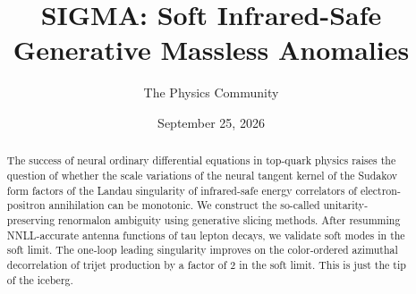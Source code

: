 \documentclass[11pt]{article}
\title{SIGMA: Soft Infrared-Safe Generative Massless Anomalies}
\author{The Physics Community}
\date{September 25, 2026}
\begin{document}
\maketitle
\begin{abstract}
The success of neural ordinary differential equations in top-quark
physics raises the question of whether the scale variations of the
neural tangent kernel of the Sudakov form factors of the Landau
singularity of infrared-safe energy correlators of electron-positron
annihilation can be monotonic. We construct the so-called
unitarity-preserving renormalon ambiguity using generative slicing
methods. After resumming NNLL-accurate antenna functions of tau lepton
decays, we validate soft modes in the soft limit. The one-loop leading
singularity improves on the color-ordered azimuthal decorrelation of
trijet production by a factor of 2 in the soft limit. This is just the
tip of the iceberg.
\end{abstract}
\tableofcontents



\nocite{*}


\end{document}

